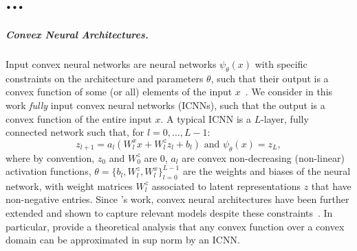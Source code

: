 \chapter{...}
\label{cha:neural_ot}


%


\paragraph{Convex Neural Architectures.}
Input convex neural networks are neural networks $\psi_\theta(x)$ with specific constraints on the architecture and parameters $\theta$, such that their output is a convex function of some (or all) elements of the input $x$~\citep{amos2017input}. We consider in this work \textit{fully} input convex neural networks (ICNNs), such that the output is a convex function of the entire input $x$. A typical ICNN is a $L$-layer, fully connected network such that, for $l = 0, \dots, L-1$:
\begin{equation} \label{eq:icnn}
    z_{l+1} = a_l(W^x_lx + W^z_l z_l + b_l)  \text{ and } \psi_\theta(x) = z_L,
\end{equation}
where by convention, $z_0$ and $W^z_0$ are $0$, $a_l$ are convex non-decreasing (non-linear) activation functions, $\theta=\{b_l, W^z_l, W^x_l\}_{l=0}^{L-1}$ are the weights and biases of the neural network, with weight matrices $W^z_l$ associated to latent representations $z$ that have non-negative entries. Since \citet{amos2017input}'s work, convex neural architectures have been further extended and shown to capture relevant models despite these constraints~\citep{amos2017input, pmlr-v119-makkuva20a, huang2021convex}. In particular, \citet{chen2018optimal} provide a theoretical analysis that any convex function over a convex domain can be approximated in sup norm by an ICNN.
